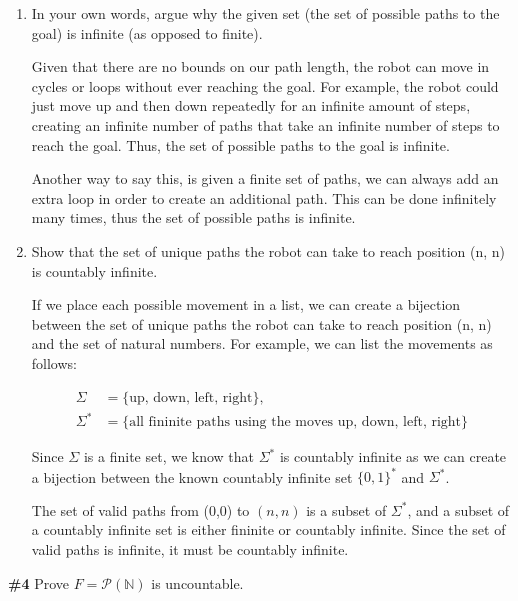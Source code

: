 \documentclass{article}
\newcommand{\problem}[1]{\textbf{\##1}}
\newcommand{\prob}[1]{\problem{#1}}
\newcommand{\AllNaturals}{\mathbb{N}}
\begin{document}
\begin{enumerate}
    \item In your own words, argue why the given set (the set of possible paths to the goal) is
infinite (as opposed to finite).

    Given that there are no bounds on our path length, the robot can move in cycles or loops without ever reaching the goal. For example, the robot could just move up and then down repeatedly for an infinite amount of steps, creating an infinite number of paths that take an infinite number of steps to reach the goal. Thus, the set of possible paths to the goal is infinite.

    Another way to say this, is given a finite set of paths, we can always add an extra loop in order to create an additional path. This can be done infinitely many times, thus the set of possible paths is infinite.

    \item Show that the set of unique paths the robot can take to reach position (n, n) is countably infinite.
    
    If we place each possible movement in a list, we can create a bijection between the set of unique paths the robot can take to reach position (n, n) and the set of natural numbers. For example, we can list the movements as follows:

    \begin{align*}
        \Sigma &= \{\text{up, down, left, right}\},\\
        \Sigma^* &= \{\text{all fininite paths using the moves up, down, left, right}\}
    \end{align*}

    Since \(\Sigma\) is a finite set, we know that \(\Sigma^*\) is countably infinite as we can create a bijection between the known countably infinite set \(\{0,1\}^*\) and \(\Sigma^*\).
    
    The set of valid paths from (0,0) to \((n,n)\) is a subset of \(\Sigma^*\), and a subset of a countably infinite set is either fininite or countably infinite. Since the set of valid paths is infinite, it must be countably infinite.

\end{enumerate}

\pagebreak

\prob{4} Prove \(F=\mathcal{P}(\AllNaturals)\) is uncountable.
\end{document}
